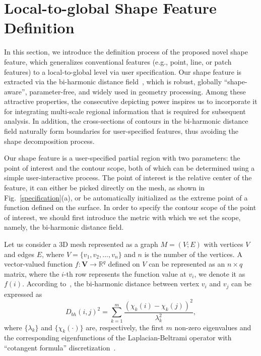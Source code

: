 \section{Local-to-global Shape Feature Definition}
\label{sec:GF}

In this section, we introduce the definition process of the proposed
novel shape feature, which generalizes conventional features (e.g.,
point, line, or patch features) to a local-to-global level via user
specification. Our shape feature is extracted via the bi-harmonic
distance field~\cite{Lipman:2010}, which is robust, globally
``shape-aware'', parameter-free, and widely used in geometry
processing. Among these attractive properties, the consecutive
depicting power inspires us to incorporate it for integrating
multi-scale regional information that is required for subsequent
analysis. In addition, the cross-sections of contours in the
bi-harmonic distance field naturally form boundaries for
user-specified features, thus avoiding the shape decomposition
process.

Our shape feature is a user-specified partial region with two
parameters: the point of interest and the contour scope, both of
which can be determined using a simple user-interactive process. The
point of interest is the relative center of the feature, it can either
be picked directly on the mesh, as shown in
Fig.~\ref{specification}(a), or be automatically initialized as the
extreme point of a function defined on the surface. In order to specify
the contour scope of the point of interest, we should first introduce
the metric with which we set the scope, namely, the bi-harmonic
distance field.

Let us consider a 3D mesh represented as a graph $M = (V;E)$ with
vertices $V$ and edges $E$, where $V = \{v_1,v_2,...,v_n\}$ and $n$ is
the number of the vertices. A vector-valued function $f \colon
\textbf{V} \rightarrow \mathbb{R}^q $ defined on $V$ can be
represented as an $n \times q$ matrix, where the $i$-th row represents
the function value at $v_i$, we denote it as $f(i)$. According
to~\cite{Lipman:2010}, the bi-harmonic distance between vertex $v_i$
and $v_j$ can be expressed as
\begin{equation}
\label{eq:bd}
D_{bh}(i,j)^2=\sum_{k=1}^{m}\frac{(\chi_k(i)-\chi_k(j))^2}{\lambda_k^2},
\end{equation}
where $\{\lambda_k\}$ and $\{\chi_k(\cdot)\}$ are, respectively, the
first $m$ non-zero eigenvalues and the corresponding eigenfunctions of
the Laplacian-Beltrami operator with ``cotangent formula''
discretization~\cite{Meyer2003}.

